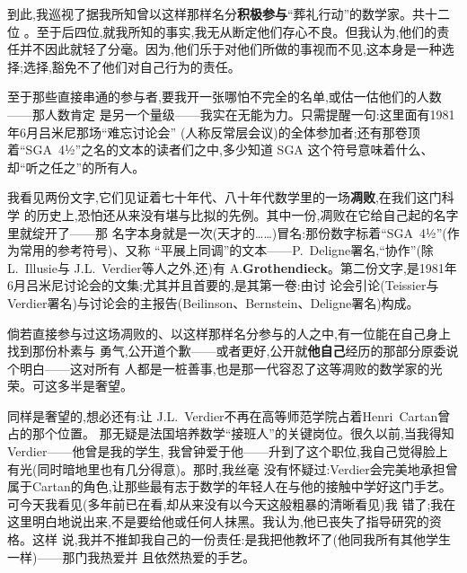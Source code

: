 \pmark 到此,我巡视了据我所知曾以这样那样名分\textbf{积极参与}“葬礼行动”的数学家。共十二位
。至于后四位,就我所知的事实,我无从断定他们存心不良。但我认为,他们的责任并不因此就轻了分毫。因为,他们乐于对他们所做的事视而不见,这本身是一种选择;选择,豁免不了他们对自己行为的责任。

至于那些直接串通的参与者,要我开一张哪怕不完全的名单,或估一估他们的人数——那人数肯定
是另一个量级——我实在无能为力。只需提醒一句:这里面有1981年6月吕米尼那场“难忘讨论会”
(人称反常层会议)的全体参加者;还有那卷顶着“SGA~4½”之名的文本的读者们之中,多少知道
SGA 这个符号意味着什么、却“听之任之”的所有人。

\pmark 我看见两份文字,它们见证着七十年代、八十年代数学里的一场\textbf{凋败},在我们这门科学
的历史上,恐怕还从来没有堪与比拟的先例。其中一份,凋败在它给自己起的名字里就绽开了——那
名字本身就是一次(天才的……)冒名:那份数字标着“SGA~4½”(作为常用的参考符号)、又称
“平展上同调”的文本——P.~Deligne署名,“协作”(除 L.~Illusie与 J.L.~Verdier等人之外,还)有
A.\textbf{Grothendieck}。第二份文字,是1981年6月吕米尼\dmark{}讨论会的文集;尤其并且首要的,是其第一卷:由讨
论会引论(Teissier与Verdier署名)与讨论会的主报告(Beilinson、Bernstein、Deligne署名)构成。

倘若直接参与过这场凋败的、以这样那样名分参与的人之中,有一位能在自己身上找到那份朴素与
勇气,公开道个歉——或者更好,公开就\textbf{他自己}经历的那部分原委说个明白——这对所有
人都是一桩善事,也是那一代容忍了这等凋败的数学家的光荣。可这多半是奢望。

同样是奢望的,想必还有:让 J.L.~Verdier不再在高等师范学院占着Henri~Cartan曾占的那个位置。
那无疑是法国培养数学“接班人”的关键岗位。很久以前,当我得知Verdier——他曾是我的学生,
我曾钟爱于他——升到了这个职位,我自己觉得脸上有光(同时暗地里也有几分得意)。那时,我丝毫
没有怀疑过:Verdier会完美地承担曾属于Cartan的角色,让那些最有志于数学的年轻人在与他的接触中学好这门手艺。可今天我看见(多年前已在看,却从来没有以今天这般粗暴的清晰看见)我
错了;我在这里明白地说出来,不是要给他或任何人抹黑。我认为,他已丧失了指导研究的资格。这样
说,我并不推卸我自己的一份责任:是我把他教坏了(他同我所有其他学生一样)——那门我热爱并
且依然热爱的手艺。

